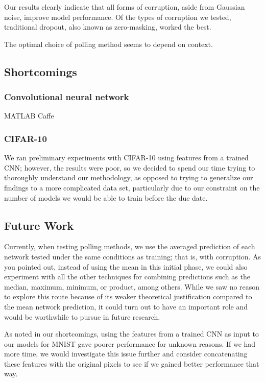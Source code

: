 \documentclass{article} %
\begin{document}
Our results clearly indicate that all forms of corruption, aside from Gaussian noise, improve model performance. Of the types of corruption we tested, traditional dropout, also known as zero-masking, worked the best.

The optimal choice of polling method seems to depend on context.

\subsection{Shortcomings}

\subsubsection{Convolutional neural network}
MATLAB
Caffe

\subsubsection{CIFAR-10}

We ran preliminary experiments with CIFAR-10 using features from a trained CNN; however, the results were poor, so we decided to spend our time trying to thoroughly understand our methodology, as opposed to trying to generalize our findings to a more complicated data set, particularly due to our constraint on the number of models we would be able to train before the due date.

\subsection{Future Work}

Currently, when testing polling methods, we use the averaged prediction of each network tested under the same conditions as training; that is, with corruption. As you pointed out, instead of using the mean in this initial phase, we could also experiment with all the other techniques for combining predictions such as the median, maximum, minimum, or product, among others. While we saw no reason to explore this route because of its weaker theoretical justification compared to the mean network prediction, it could turn out to have an important role and would be worthwhile to pursue in future research.

As noted in our shortcomings, using the features from a trained CNN as input to our models for MNIST gave poorer performance for unknown reasons. If we had more time, we would investigate this issue further and consider concatenating these features with the original pixels to see if we gained better performance that way.
\end{document}
